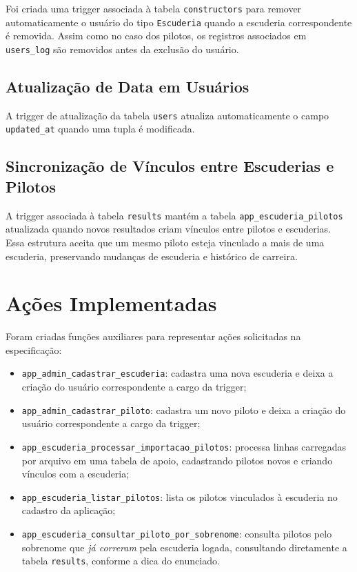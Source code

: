 \documentclass[12pt,a4paper]{article}
\begin{document}
Foi criada uma trigger associada à tabela \texttt{constructors} para remover automaticamente o usuário do tipo \texttt{Escuderia} quando a escuderia correspondente é removida. Assim como no caso dos pilotos, os registros associados em \texttt{users\_log} são removidos antes da exclusão do usuário.

\subsection{Atualização de Data em Usuários}

A trigger de atualização da tabela \texttt{users} atualiza automaticamente o campo \texttt{updated\_at} quando uma tupla é modificada.

\subsection{Sincronização de Vínculos entre Escuderias e Pilotos}

A trigger associada à tabela \texttt{results} mantém a tabela \texttt{app\_escuderia\_pilotos} atualizada quando novos resultados criam vínculos entre pilotos e escuderias. Essa estrutura aceita que um mesmo piloto esteja vinculado a mais de uma escuderia, preservando mudanças de escuderia e histórico de carreira.

\section{Ações Implementadas}

Foram criadas funções auxiliares para representar ações solicitadas na especificação:

\begin{itemize}
    \item \texttt{app\_admin\_cadastrar\_escuderia}: cadastra uma nova escuderia e deixa a criação do usuário correspondente a cargo da trigger;
    \item \texttt{app\_admin\_cadastrar\_piloto}: cadastra um novo piloto e deixa a criação do usuário correspondente a cargo da trigger;
    \item \texttt{app\_escuderia\_processar\_importacao\_pilotos}: processa linhas carregadas por arquivo em uma tabela de apoio, cadastrando pilotos novos e criando vínculos com a escuderia;
    \item \texttt{app\_escuderia\_listar\_pilotos}: lista os pilotos vinculados à escuderia no cadastro da aplicação;
    \item \texttt{app\_escuderia\_consultar\_piloto\_por\_sobrenome}: consulta pilotos pelo sobrenome que \emph{já correram} pela escuderia logada, consultando diretamente a tabela \texttt{results}, conforme a dica do enunciado.
\end{itemize}
\end{document}
